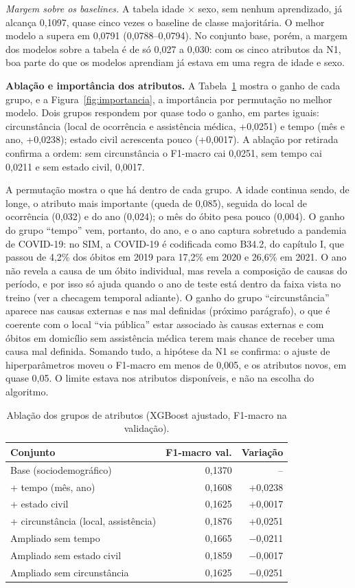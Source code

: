 \documentclass[12pt]{article}
\begin{document}
\emph{Margem sobre os baselines.} A tabela idade $\times$ sexo, sem nenhum aprendizado, já alcança 0,1097, quase cinco vezes o baseline de classe majoritária. O melhor modelo a supera em 0,0791 (0,0788--0,0794). No conjunto base, porém, a margem dos modelos sobre a tabela é de só 0,027 a 0,030: com os cinco atributos da N1, boa parte do que os modelos aprendiam já estava em uma regra de idade e sexo.

\textbf{Ablação e importância dos atributos.} A Tabela~\ref{tab:ablacao} mostra o ganho de cada grupo, e a Figura~\ref{fig:importancia}, a importância por permutação no melhor modelo. Dois grupos respondem por quase todo o ganho, em partes iguais: circunstância (local de ocorrência e assistência médica, +0,0251) e tempo (mês e ano, +0,0238); estado civil acrescenta pouco (+0,0017). A ablação por retirada confirma a ordem: sem circunstância o F1-macro cai 0,0251, sem tempo cai 0,0211 e sem estado civil, 0,0017.

A permutação mostra o que há dentro de cada grupo. A idade continua sendo, de longe, o atributo mais importante (queda de 0,085), seguida do local de ocorrência (0,032) e do ano (0,024); o mês do óbito pesa pouco (0,004). O ganho do grupo ``tempo'' vem, portanto, do ano, e o ano captura sobretudo a pandemia de COVID-19: no SIM, a COVID-19 é codificada como B34.2, do capítulo I, que passou de 4,2\% dos óbitos em 2019 para 17,2\% em 2020 e 26,6\% em 2021. O ano não revela a causa de um óbito individual, mas revela a composição de causas do período, e por isso só ajuda quando o ano de teste está dentro da faixa vista no treino (ver a checagem temporal adiante). O ganho do grupo ``circunstância'' aparece nas causas externas e nas mal definidas (próximo parágrafo), o que é coerente com o local ``via pública'' estar associado às causas externas e com óbitos em domicílio sem assistência médica terem mais chance de receber uma causa mal definida. Somando tudo, a hipótese da N1 se confirma: o ajuste de hiperparâmetros moveu o F1-macro em menos de 0,005, e os atributos novos, em quase 0,05. O limite estava nos atributos disponíveis, e não na escolha do algoritmo.

\begin{table}[ht]
\centering
\caption{Ablação dos grupos de atributos (XGBoost ajustado, F1-macro na validação).}
\label{tab:ablacao}
\small
\begin{tabular}{|l|r|r|}
\hline
\textbf{Conjunto} & \textbf{F1-macro val.} & \textbf{Variação} \\
\hline
Base (sociodemográfico) & 0,1370 & -- \\
+ tempo (mês, ano) & 0,1608 & +0,0238 \\
+ estado civil & 0,1625 & +0,0017 \\
+ circunstância (local, assistência) & 0,1876 & +0,0251 \\
\hline
Ampliado sem tempo & 0,1665 & $-$0,0211 \\
Ampliado sem estado civil & 0,1859 & $-$0,0017 \\
Ampliado sem circunstância & 0,1625 & $-$0,0251 \\
\hline
\end{tabular}
\end{table}
\end{document}
